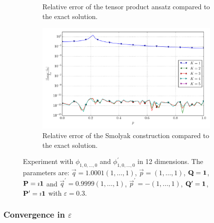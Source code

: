 \documentclass[a4paper,10pt]{article}
\begin{document}
\begin{figure}[ht!]
\begin{subfigure}[t]{0.5\linewidth}
    \caption{Relative error of the tensor product ansatz compared to the exact solution.}
    \label{fig:tp_sg_12d_conv_p_100000000000_100000000000_err_rel_nsd_tp}
  \end{subfigure}
  \begin{subfigure}[t]{0.5\linewidth}
    \includegraphics[width=\linewidth]{./plots/tp_sg_12d_conv_p_(1,0,0,0,0,0,0,0,0,0,0,0)_(1,0,0,0,0,0,0,0,0,0,0,0)_err_rel_nsd_gk.pdf}
    \caption{Relative error of the Smolyak construction compared to the exact solution.}
    \label{fig:tp_sg_12d_conv_p_100000000000_100000000000_err_rel_nsd_gk}
  \end{subfigure}
  \label{fig:tp_sg_12d_conv_p_100000000000_100000000000}
  \caption{Experiment with $\phi_{1, 0, \ldots, 0}$ and $\phi_{1, 0, \ldots, 0}^{\prime}$
  in 12 dimensions.
  The parameters are:
  $\vec{q} = 1.0001 (1,\ldots,1)$,
  $\vec{p} = (1,\ldots,1)$,
  $\mathbf{Q} = \mathbf{1}$,
  $\mathbf{P} = \imath \mathbf{1}$
  and
  $\vec{q}^\prime = 0.9999 (1,\ldots,1)$,
  $\vec{p}^\prime = -(1,\ldots,1)$,
  $\mathbf{Q}^\prime = \mathbf{1}$,
  $\mathbf{P}^\prime = \imath \mathbf{1}$
  with $\varepsilon=0.3$.}
\end{figure}


\FloatBarrier
\subsubsection{Convergence in $\varepsilon$}
\end{document}
